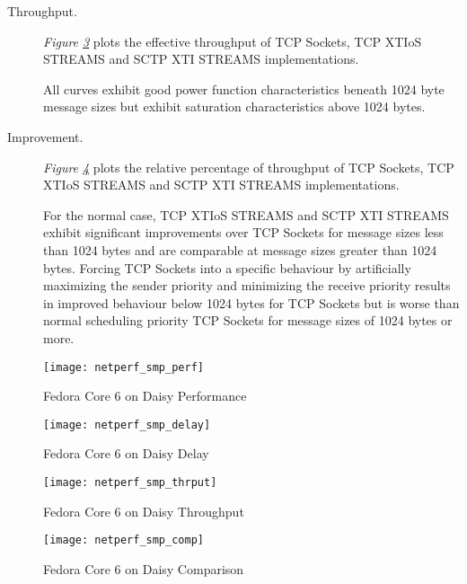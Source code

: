 \documentclass[letterpaper,final,notitlepage,twocolumn,10pt,twoside]{article}
\begin{document}
\begin{description}
\item[Throughput.]

\textit{Figure \ref{figure:smpthrput}}
plots the effective throughput of TCP Sockets, TCP XTIoS STREAMS and SCTP XTI STREAMS
implementations.

All curves exhibit good power function characteristics beneath 1024 byte  message sizes but exhibit
saturation characteristics above 1024 bytes.

\item[Improvement.]

\textit{Figure \ref{figure:smpcomp}}
plots the relative percentage of throughput of TCP Sockets, TCP XTIoS STREAMS and SCTP XTI STREAMS
implementations.

For the normal case, TCP XTIoS STREAMS and SCTP XTI STREAMS exhibit significant improvements over
TCP Sockets for message sizes less than 1024 bytes and are comparable  at message sizes greater than
1024 bytes.  Forcing TCP Sockets into a specific behaviour by artificially maximizing the sender
priority and minimizing the receive priority results in improved behaviour below 1024 bytes for TCP
Sockets but is worse than normal scheduling priority TCP Sockets for message sizes of 1024 bytes or
more.

\end{description}

\begin{figure}[p]
\center\texttt{[image: netperf\_smp\_perf]}
\caption[Fedora Core 6 on Daisy Performance]{Fedora Core 6 on Daisy Performance}
\label{figure:smpperf}
\end{figure}

\begin{figure}[p]
\center\texttt{[image: netperf\_smp\_delay]}
\caption[Fedora Core 6 on Daisy Delay]{Fedora Core 6 on Daisy Delay}
\label{figure:smpdly}
\end{figure}

\begin{figure}[p]
\center\texttt{[image: netperf\_smp\_thrput]}
\caption[Fedora Core 6 on Daisy Throughput]{Fedora Core 6 on Daisy Throughput}
\label{figure:smpthrput}
\end{figure}

\begin{figure}[p]
\center\texttt{[image: netperf\_smp\_comp]}
\caption[Fedora Core 6 on Daisy Comparison]{Fedora Core 6 on Daisy Comparison}
\label{figure:smpcomp}
\end{figure}
\end{document}
